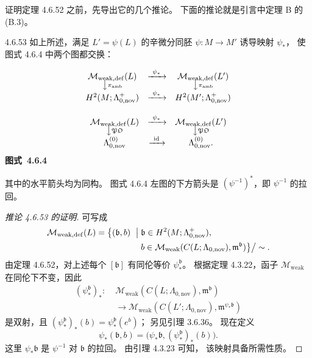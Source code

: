 证明定理 4.6.52 之前，先导出它的几个推论。
下面的推论就是引言中定理 B 的 (B.3)。
\begin{corollary}{4.6.53}\label{cor:4-6-53}
如上所述，满足 $L'=\psi(L)$ 的辛微分同胚
$\psi\colon M\to M'$ 诱导映射 $\psi_*$，
使图式 4.6.4 中两个图都交换：
\begin{center}
\centering
\[
\begin{gathered}
\begin{array}{ccc}
\mathcal M_{\mathrm{weak,def}}(L)
 &\xrightarrow{\ \psi_*\ }&
\mathcal M_{\mathrm{weak,def}}(L')\\[-1mm]
\big\downarrow{\scriptstyle\pi_{\mathrm{amb}}}
 &&\big\downarrow{\scriptstyle\pi_{\mathrm{amb}}}\\
H^2(M;\Lambda^+_{0,\mathrm{nov}})
 &\xrightarrow{\ \psi_*\ }&
H^2(M';\Lambda^+_{0,\mathrm{nov}})
\end{array}
\\[3mm]
\begin{array}{ccc}
\mathcal M_{\mathrm{weak,def}}(L)
 &\xrightarrow{\ \psi_*\ }&
\mathcal M_{\mathrm{weak,def}}(L')\\[-1mm]
\big\downarrow{\scriptstyle\mathfrak{PO}}
 &&\big\downarrow{\scriptstyle\mathfrak{PO}}\\
\Lambda_{0,\mathrm{nov}}^{(0)}
 &\xrightarrow{\ \mathrm{id}\ }&
\Lambda_{0,\mathrm{nov}}^{(0)} .
\end{array}
\end{gathered}
\]
\renewcommand{\thefigure}{4.6.4}
{\normalfont\bfseries 图式~\thefigure}\label{diag:4-6-4}
\end{center}
其中的水平箭头均为同构。
图式 4.6.4 左图的下方箭头是
$(\psi^{-1})^*$，即 $\psi^{-1}$ 的拉回。
\end{corollary}

\begin{proof}[推论 4.6.53 的证明]
可写成
\[
\begin{aligned}
\mathcal M_{\mathrm{weak,def}}(L)
=\bigl\{(\mathfrak b,b)\ \bigm|\;&
\mathfrak b\in H^2(M;\Lambda^+_{0,\mathrm{nov}}),\\
&b\in\mathcal M_{\mathrm{weak}}
  (C(L;\Lambda_{0,\mathrm{nov}}),
   \mathfrak m^{\mathfrak b})\bigr\}\big/\sim .
\end{aligned}
\]
由定理 4.6.52，对上述每个 $[\mathfrak b]$
有同伦等价 $\psi_*^{\mathfrak b}$。
根据定理 4.3.22，函子 $\mathcal M_{\mathrm{weak}}$
在同伦下不变，因此
\[
\begin{aligned}
(\psi_*^{\mathfrak b})_*\colon\;
&\mathcal M_{\mathrm{weak}}
 (C(L;\Lambda_{0,\mathrm{nov}}),\mathfrak m^{\mathfrak b})
\\[-1mm]
&\longrightarrow
\mathcal M_{\mathrm{weak}}
 (C(L';\Lambda_{0,\mathrm{nov}}),
  \mathfrak m^{\psi_*\mathfrak b})
\end{aligned}
\]
是双射，且
$(\psi_*^{\mathfrak b})_*(b)
=\psi_*^{\mathfrak b}(e^b)$；
另见引理 3.6.36。
现在定义
\[
\psi_*(\mathfrak b,b)
=\bigl(\psi_*\mathfrak b,
       (\psi_*^{\mathfrak b})_*(b)\bigr).
\]
这里 $\psi_*\mathfrak b$ 是
$\psi^{-1}$ 对 $\mathfrak b$ 的拉回。
由引理 4.3.23 可知，
该映射具备所需性质。
\end{proof}

